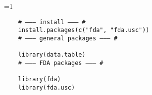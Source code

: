 \ifnum\value{code}=1
	\begin{verbatim}
    # ——— install ——— #
    install.packages(c("fda", "fda.usc"))
    # ——— general packages ——— #

    library(data.table)
    # ——— FDA packages ——— #
    
    library(fda)
    library(fda.usc)
\end{verbatim}
\fi
